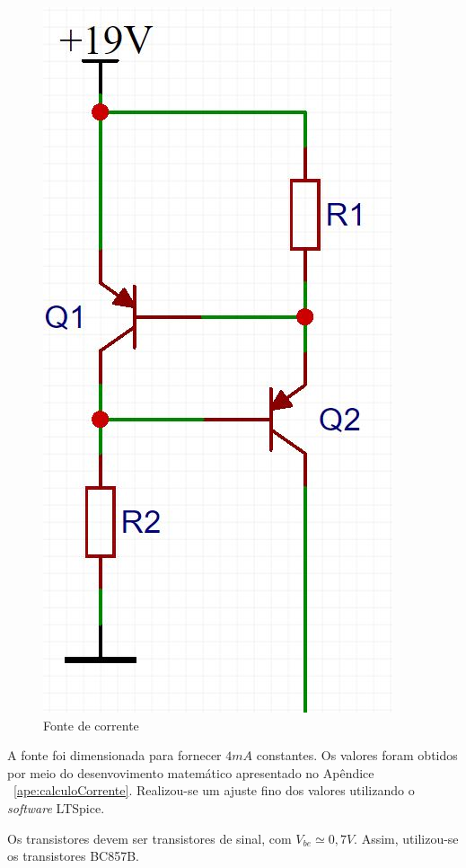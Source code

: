 \documentclass[
	12pt,				%
	openright,			%
	twoside,			%
	a4paper,			%
	english,			%
	french,				%
	spanish,			%
	brazil,				%
	]{abntex2}
\begin{document}
		\begin{figure}[!ht]
			\centering
			\includegraphics[scale = 0.3]{../Fotos/fonteCorrenteClean2.jpg}
			\caption{Fonte de corrente}
			\label{fig:topologiaFonteCorrente}
		\end{figure}

		A fonte foi dimensionada para fornecer $4mA$ constantes. Os valores foram obtidos por meio do desenvovimento matemático apresentado no Apêndice ~\ref{ape:calculoCorrente}. Realizou-se um ajuste fino dos valores utilizando o \textit{software} LTSpice.

		Os transistores devem ser transistores de sinal, com
		$V_{be}\simeq 0,7V$. Assim, utilizou-se os transistores BC857B.
\end{document}
